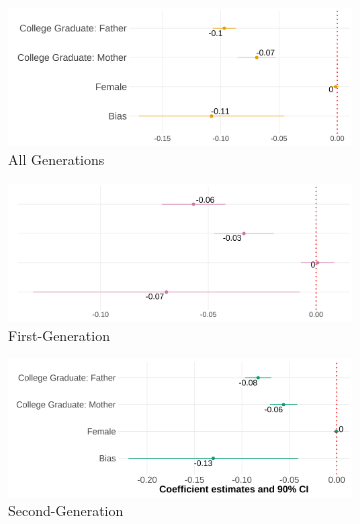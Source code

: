 \documentclass[12pt,english]{article}
\begin{document}
\pagebreak
\newpage

\begin{center}
\begin{figure}[!htb]
\centering
\caption{Relationship Between Self-Reported Hispanic Identity and Bias: By Generation}
\label{plot01-regression-gen}
\begin{subfigure}{.48\textwidth}
\caption{All Generations}
\centering
\includegraphics[width=.9\linewidth]{figure/skin-iat-regression-all-gens.png}
\end{subfigure}
\centering
\begin{subfigure}{.48\textwidth}
\caption{First-Generation}
\centering
\includegraphics[width=.9\linewidth]{figure/skin-iat-regression-first-gen.png}
\end{subfigure}
\begin{subfigure}{.48\textwidth}
\caption{Second-Generation}
\centering
\includegraphics[width=.9\linewidth]{figure/skin-iat-regression-second-gen.png}
\end{subfigure}
\begin{subfigure}{.48\textwidth}

\end{subfigure}
\end{figure}
\end{center}
\end{document}
